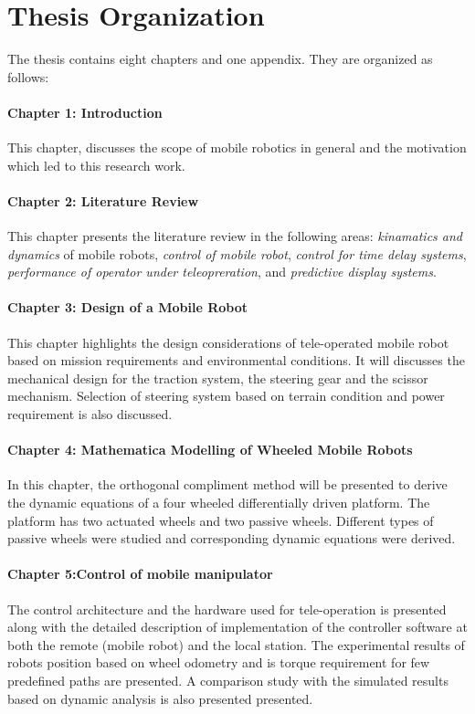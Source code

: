 \section{Thesis Organization}
The thesis contains eight chapters and one appendix. They are organized as follows:
\paragraph*{Chapter 1: Introduction\\}
This  chapter, discusses the scope of mobile robotics in general and the motivation which led to this research work.
\paragraph*{Chapter 2: Literature Review\\}
This chapter presents the literature review in the following areas: \textit{kinamatics and dynamics} of mobile robots, \textit{control of mobile robot}, \textit{control for time delay systems}, \textit{performance of operator under teleopreration},  and \textit{predictive display systems}.

\paragraph*{Chapter 3: Design of a Mobile Robot\\}
This chapter highlights the design considerations of tele-operated mobile robot based on mission requirements and  environmental conditions.  It will discusses the mechanical design for the traction system, the steering gear and the scissor mechanism. Selection of  steering system based on terrain condition and power requirement is also discussed.   
\paragraph*{Chapter 4: Mathematica Modelling of Wheeled Mobile Robots \\}
In this chapter, the orthogonal compliment method will be presented to  derive the dynamic equations of a four wheeled differentially driven platform. The platform has two actuated wheels and two passive wheels. Different types of passive wheels were studied and  corresponding dynamic equations were derived. 
\paragraph*{Chapter 5:Control of mobile manipulator \\}
The control architecture and the hardware used for tele-operation is presented along with the detailed description of implementation of the controller software at both the remote (mobile robot)  and the local station. The experimental results of robots position based on wheel odometry and is torque requirement for few predefined paths are presented. A comparison study  with the simulated results based on dynamic analysis is also presented presented.   
